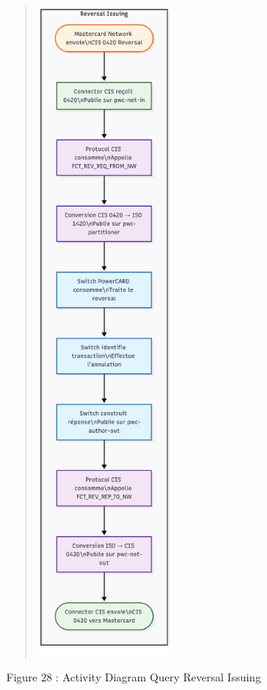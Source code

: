 \documentclass[12pt,a4paper]{report}
\begin{document}
\begin{quote}
\includegraphics[width=1.78429in,height=8.60738in]{vertopal_d1b0b2209edd4c6aa8254f57daa0953b/media/image47.png}
\end{quote}

\protect\hypertarget{_Toc201954504}{}{}Figure 28 : Activity Diagram
Query Reversal Issuing
\end{document}
